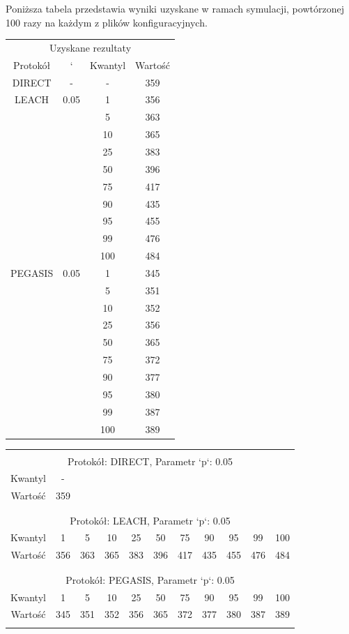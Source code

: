 \documentclass[a4paper,12pt,twoside,openany]{report}
\begin{document}
Poniższa tabela przedstawia wyniki uzyskane w ramach symulacji, powtórzonej 100 razy na każdym z plików konfiguracyjnych. 

\begin{longtable}{*{4}{c}}
\toprule
\multicolumn{4}{c}{Uzyskane rezultaty} \\
Protokół	& `	& Kwantyl	& Wartość \\
\midrule
\endhead
DIRECT	& - 	& -	& 359 \\*
\midrule
LEACH	& 0.05	& 1	& 356 \\*
	&	& 5	& 363 \\*
	&	& 10	& 365 \\*
	&	& 25	& 383 \\*
	&	& 50	& 396 \\*
	&	& 75	& 417 \\*
	&	& 90	& 435 \\*
	&	& 95	& 455 \\*
	&	& 99	& 476 \\*
	&	& 100	& 484 \\*
\midrule
PEGASIS	& 0.05	& 1	& 345 \\*
	&	& 5	& 351 \\*
	&	& 10	& 352 \\*
	&	& 25	& 356 \\*
	&	& 50	& 365 \\*
	&	& 75	& 372 \\*
	&	& 90	& 377 \\*
	&	& 95	& 380 \\*
	&	& 99	& 387 \\*
	&	& 100	& 389 \\*
\bottomrule
\end{longtable}

\begin{longtable}{*{11}{c}}
\toprule \\*
\multicolumn{11}{c}{Protokół: DIRECT, Parametr `p`: 0.05} \\*
Kwantyl	& -	\\*
Wartość	& 359	\\*
\midrule \\*
\\*
\multicolumn{11}{c}{Protokół: LEACH, Parametr `p`: 0.05} \\*
Kwantyl	& 1	& 5	& 10	& 25	& 50	& 75	& 90	& 95	& 99	& 100	\\*
Wartość	& 356	& 363	& 365	& 383	& 396	& 417	& 435	& 455	& 476	& 484	\\*
\midrule \\*
\\*
\multicolumn{11}{c}{Protokół: PEGASIS, Parametr `p`: 0.05} \\*
Kwantyl	& 1	& 5	& 10	& 25	& 50	& 75	& 90	& 95	& 99	& 100	\\*
Wartość	& 345	& 351	& 352	& 356	& 365	& 372	& 377	& 380	& 387	& 389	\\*	
\bottomrule \\*
\end{longtable}
\end{document}
